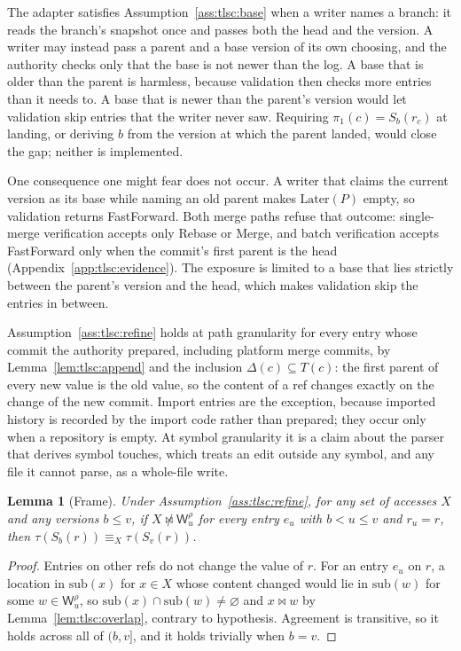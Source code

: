 \documentclass[11pt,letterpaper]{article}
\newtheorem{lemma}[theorem]{Lemma}
\theoremstyle{definition}
\theoremstyle{remark}
\newcommand{\W}{\mathsf{W}}
\newcommand{\Snap}[1]{S_{#1}}
\newcommand{\meets}{\bowtie}
\newcommand{\nmeets}{\not\bowtie}
\newcommand{\Later}{\mathrm{Later}}
\newcommand{\tree}{\tau}
\newcommand{\fp}{\pi_1}
\begin{document}
The adapter satisfies Assumption~\ref{ass:tlsc:base} when a writer names a branch: it reads the branch's snapshot once and passes both the head and the version. A writer may instead pass a parent and a base version of its own choosing, and the authority checks only that the base is not newer than the log. A base that is older than the parent is harmless, because validation then checks more entries than it needs to. A base that is newer than the parent's version would let validation skip entries that the writer never saw. Requiring $\fp(c)=\Snap{b}(r_c)$ at landing, or deriving $b$ from the version at which the parent landed, would close the gap; neither is implemented.

One consequence one might fear does not occur. A writer that claims the current version as its base while naming an old parent makes $\Later(P)$ empty, so validation returns FastForward. Both merge paths refuse that outcome: single-merge verification accepts only Rebase or Merge, and batch verification accepts FastForward only when the commit's first parent is the head (Appendix~\ref{app:tlsc:evidence}). The exposure is limited to a base that lies strictly between the parent's version and the head, which makes validation skip the entries in between.

Assumption~\ref{ass:tlsc:refine} holds at path granularity for every entry whose commit the authority prepared, including platform merge commits, by Lemma~\ref{lem:tlsc:append} and the inclusion $\Delta(c)\subseteq T(c)$: the first parent of every new value is the old value, so the content of a ref changes exactly on the change of the new commit. Import entries are the exception, because imported history is recorded by the import code rather than prepared; they occur only when a repository is empty. At symbol granularity it is a claim about the parser that derives symbol touches, which treats an edit outside any symbol, and any file it cannot parse, as a whole-file write.

\begin{lemma}[Frame]
\label{lem:tlsc:frame}
Under Assumption~\ref{ass:tlsc:refine}, for any set of accesses $X$ and any versions $b\leq v$, if $X\nmeets\W^{\rho}_u$ for every entry $e_u$ with $b<u\leq v$ and $r_u=r$, then $\tree(\Snap{b}(r))\equiv_X\tree(\Snap{v}(r))$.
\end{lemma}

\begin{proof}
Entries on other refs do not change the value of $r$. For an entry $e_u$ on $r$, a location in $\mathrm{sub}(x)$ for $x\in X$ whose content changed would lie in $\mathrm{sub}(w)$ for some $w\in\W^{\rho}_u$, so $\mathrm{sub}(x)\cap\mathrm{sub}(w)\neq\varnothing$ and $x\meets w$ by Lemma~\ref{lem:tlsc:overlap}, contrary to hypothesis. Agreement is transitive, so it holds across all of $(b,v]$, and it holds trivially when $b=v$.
\end{proof}
\end{document}
